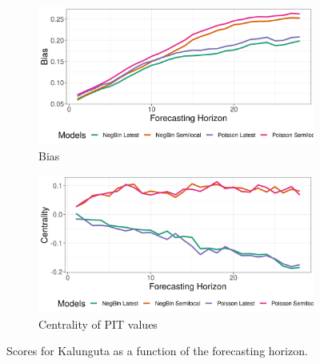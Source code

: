 \begin{figure}[H]
\begin{subfigure}{0.5\textwidth}
  \centering
  \includegraphics[width=\linewidth]{../output/Kalunguta_bias.png}  
  \caption{Bias}
  \label{fig:Kalunguta_scores_3}
\end{subfigure}
\begin{subfigure}{0.5\textwidth}
  \centering
  \includegraphics[width=\linewidth]{../output/Kalunguta_centrality.png}  
  \caption{Centrality of PIT values}
  \label{fig:Kalunguta_scores_4}
\end{subfigure}
  \caption{Scores for Kalunguta as a function of the forecasting horizon.}

  \label{fig:nat_scores}
\end{figure}
